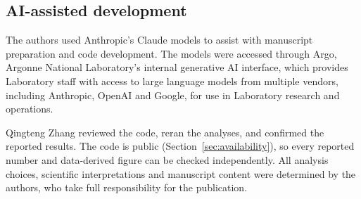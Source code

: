 \documentclass[11pt]{article}
\begin{document}
\subsection{AI-assisted development}
\label{sec:ai}
The authors used Anthropic's Claude models to assist with manuscript preparation and code development. The models were accessed through Argo, Argonne National Laboratory's internal generative AI interface, which provides Laboratory staff with access to large language models from multiple vendors, including Anthropic, OpenAI and Google, for use in Laboratory research and operations. 

Qingteng Zhang reviewed the code, reran the analyses, and confirmed the reported results. The code is public (Section~\ref{sec:availability}), so every reported number and data-derived figure can be checked independently. All analysis choices, scientific interpretations and manuscript content were determined by the authors, who take full responsibility for the publication.
\end{document}
